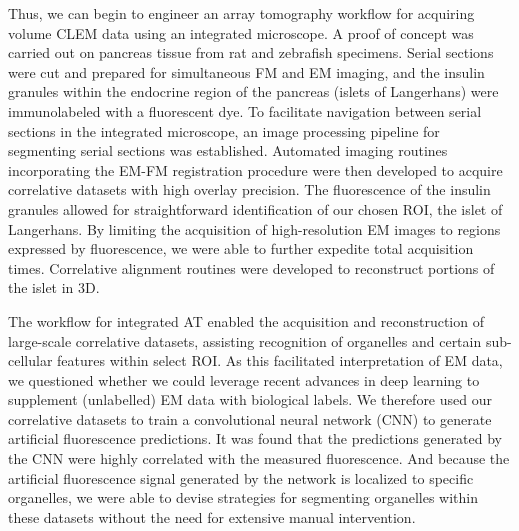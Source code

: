 Thus, we can begin to engineer an array tomography workflow for acquiring volume CLEM data using an integrated microscope. A proof of concept was carried out on pancreas tissue from rat and zebrafish specimens. Serial sections were cut and prepared for simultaneous FM and EM imaging, and the insulin granules within the endocrine region of the pancreas (islets of Langerhans) were immunolabeled with a fluorescent dye. To facilitate navigation between serial sections in the integrated microscope, an image processing pipeline for segmenting serial sections was established. Automated imaging routines incorporating the EM-FM registration procedure were then developed to acquire correlative datasets with high overlay precision. The fluorescence of the insulin granules allowed for straightforward identification of our chosen ROI, the islet of Langerhans. By limiting the acquisition of high-resolution EM images to regions expressed by fluorescence, we were able to further expedite total acquisition times. Correlative alignment routines were developed to reconstruct portions of the islet in 3D.

The workflow for integrated AT enabled the acquisition and reconstruction of large-scale correlative datasets, assisting recognition of organelles and certain sub-cellular features within select ROI. As this facilitated interpretation of EM data, we questioned whether we could leverage recent advances in deep learning to supplement (unlabelled) EM data with biological labels. We therefore used our correlative datasets to train a convolutional neural network (CNN) to generate artificial fluorescence predictions. It was found that the predictions generated by the CNN were highly correlated with the measured fluorescence. And because the artificial fluorescence signal generated by the network is localized to specific organelles, we were able to devise strategies for segmenting organelles within these datasets without the need for extensive manual intervention.





